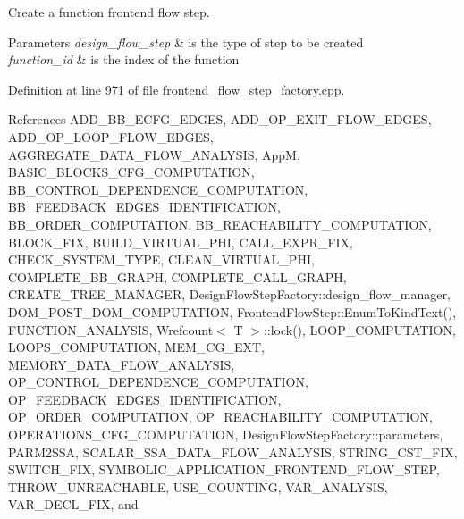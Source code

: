 Create a function frontend flow step. 


\begin{DoxyParams}{Parameters}
{\em design\+\_\+flow\+\_\+step} & is the type of step to be created \\
\hline
{\em function\+\_\+id} & is the index of the function \\
\hline
\end{DoxyParams}


Definition at line 971 of file frontend\+\_\+flow\+\_\+step\+\_\+factory.\+cpp.



References A\+D\+D\+\_\+\+B\+B\+\_\+\+E\+C\+F\+G\+\_\+\+E\+D\+G\+ES, A\+D\+D\+\_\+\+O\+P\+\_\+\+E\+X\+I\+T\+\_\+\+F\+L\+O\+W\+\_\+\+E\+D\+G\+ES, A\+D\+D\+\_\+\+O\+P\+\_\+\+L\+O\+O\+P\+\_\+\+F\+L\+O\+W\+\_\+\+E\+D\+G\+ES, A\+G\+G\+R\+E\+G\+A\+T\+E\+\_\+\+D\+A\+T\+A\+\_\+\+F\+L\+O\+W\+\_\+\+A\+N\+A\+L\+Y\+S\+IS, AppM, B\+A\+S\+I\+C\+\_\+\+B\+L\+O\+C\+K\+S\+\_\+\+C\+F\+G\+\_\+\+C\+O\+M\+P\+U\+T\+A\+T\+I\+ON, B\+B\+\_\+\+C\+O\+N\+T\+R\+O\+L\+\_\+\+D\+E\+P\+E\+N\+D\+E\+N\+C\+E\+\_\+\+C\+O\+M\+P\+U\+T\+A\+T\+I\+ON, B\+B\+\_\+\+F\+E\+E\+D\+B\+A\+C\+K\+\_\+\+E\+D\+G\+E\+S\+\_\+\+I\+D\+E\+N\+T\+I\+F\+I\+C\+A\+T\+I\+ON, B\+B\+\_\+\+O\+R\+D\+E\+R\+\_\+\+C\+O\+M\+P\+U\+T\+A\+T\+I\+ON, B\+B\+\_\+\+R\+E\+A\+C\+H\+A\+B\+I\+L\+I\+T\+Y\+\_\+\+C\+O\+M\+P\+U\+T\+A\+T\+I\+ON, B\+L\+O\+C\+K\+\_\+\+F\+IX, B\+U\+I\+L\+D\+\_\+\+V\+I\+R\+T\+U\+A\+L\+\_\+\+P\+HI, C\+A\+L\+L\+\_\+\+E\+X\+P\+R\+\_\+\+F\+IX, C\+H\+E\+C\+K\+\_\+\+S\+Y\+S\+T\+E\+M\+\_\+\+T\+Y\+PE, C\+L\+E\+A\+N\+\_\+\+V\+I\+R\+T\+U\+A\+L\+\_\+\+P\+HI, C\+O\+M\+P\+L\+E\+T\+E\+\_\+\+B\+B\+\_\+\+G\+R\+A\+PH, C\+O\+M\+P\+L\+E\+T\+E\+\_\+\+C\+A\+L\+L\+\_\+\+G\+R\+A\+PH, C\+R\+E\+A\+T\+E\+\_\+\+T\+R\+E\+E\+\_\+\+M\+A\+N\+A\+G\+ER, Design\+Flow\+Step\+Factory\+::design\+\_\+flow\+\_\+manager, D\+O\+M\+\_\+\+P\+O\+S\+T\+\_\+\+D\+O\+M\+\_\+\+C\+O\+M\+P\+U\+T\+A\+T\+I\+ON, Frontend\+Flow\+Step\+::\+Enum\+To\+Kind\+Text(), F\+U\+N\+C\+T\+I\+O\+N\+\_\+\+A\+N\+A\+L\+Y\+S\+IS, Wrefcount$<$ T $>$\+::lock(), L\+O\+O\+P\+\_\+\+C\+O\+M\+P\+U\+T\+A\+T\+I\+ON, L\+O\+O\+P\+S\+\_\+\+C\+O\+M\+P\+U\+T\+A\+T\+I\+ON, M\+E\+M\+\_\+\+C\+G\+\_\+\+E\+XT, M\+E\+M\+O\+R\+Y\+\_\+\+D\+A\+T\+A\+\_\+\+F\+L\+O\+W\+\_\+\+A\+N\+A\+L\+Y\+S\+IS, O\+P\+\_\+\+C\+O\+N\+T\+R\+O\+L\+\_\+\+D\+E\+P\+E\+N\+D\+E\+N\+C\+E\+\_\+\+C\+O\+M\+P\+U\+T\+A\+T\+I\+ON, O\+P\+\_\+\+F\+E\+E\+D\+B\+A\+C\+K\+\_\+\+E\+D\+G\+E\+S\+\_\+\+I\+D\+E\+N\+T\+I\+F\+I\+C\+A\+T\+I\+ON, O\+P\+\_\+\+O\+R\+D\+E\+R\+\_\+\+C\+O\+M\+P\+U\+T\+A\+T\+I\+ON, O\+P\+\_\+\+R\+E\+A\+C\+H\+A\+B\+I\+L\+I\+T\+Y\+\_\+\+C\+O\+M\+P\+U\+T\+A\+T\+I\+ON, O\+P\+E\+R\+A\+T\+I\+O\+N\+S\+\_\+\+C\+F\+G\+\_\+\+C\+O\+M\+P\+U\+T\+A\+T\+I\+ON, Design\+Flow\+Step\+Factory\+::parameters, P\+A\+R\+M2\+S\+SA, S\+C\+A\+L\+A\+R\+\_\+\+S\+S\+A\+\_\+\+D\+A\+T\+A\+\_\+\+F\+L\+O\+W\+\_\+\+A\+N\+A\+L\+Y\+S\+IS, S\+T\+R\+I\+N\+G\+\_\+\+C\+S\+T\+\_\+\+F\+IX, S\+W\+I\+T\+C\+H\+\_\+\+F\+IX, S\+Y\+M\+B\+O\+L\+I\+C\+\_\+\+A\+P\+P\+L\+I\+C\+A\+T\+I\+O\+N\+\_\+\+F\+R\+O\+N\+T\+E\+N\+D\+\_\+\+F\+L\+O\+W\+\_\+\+S\+T\+EP, T\+H\+R\+O\+W\+\_\+\+U\+N\+R\+E\+A\+C\+H\+A\+B\+LE, U\+S\+E\+\_\+\+C\+O\+U\+N\+T\+I\+NG, V\+A\+R\+\_\+\+A\+N\+A\+L\+Y\+S\+IS, V\+A\+R\+\_\+\+D\+E\+C\+L\+\_\+\+F\+IX, and 